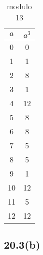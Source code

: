 \begin{table}[H]
\begin{subtable}[b]{.24\linewidth}
	\centering
	\begin{tabular}{c|c}
		$a$ & $a^3$ \\ \hline
		0 & 0 \\
		1 & 1 \\
		2 & 8 \\
		3 & 1 \\
		4 & 12 \\
		5 & 8 \\
		6 & 8 \\
		7 & 5 \\
		8 & 5 \\
		9 & 1 \\
		10 & 12 \\
		11 & 5 \\
		12 & 12
	\end{tabular}
	\caption*{modulo 13}
\end{subtable}
\end{table}


\subsection{20.3(b)}
